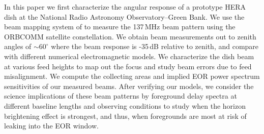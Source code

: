 \documentclass{emulateapj}
\begin{document}

In this paper we first characterize the angular response of a prototype HERA dish at the National Radio 
Astronomy Observatory--Green Bank. We use the beam mapping system of \citet{neben15} to 
measure the 137\,MHz beam pattern using the ORBCOMM satellite constellation. We obtain beam 
measurements out to zenith angles of $\sim60^\circ$ where the beam response is -35\,dB relative to zenith, and compare with different numerical electromagnetic models. We characterize the dish beam at various feed heights to map out the focus and study beam errors due to feed misalignment. We compute the collecting areas and implied EOR power spectrum sensitivities of our measured beams. After verifying our models, we consider the science implications of these 
beam patterns by foreground delay spectra at different baseline lengths and observing conditions to study when the horizon brightening effect is strongest, and thus, when foregrounds are most at risk of leaking into the EOR window.
\end{document}
